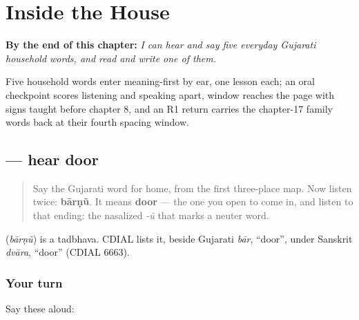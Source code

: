 
\chapter{Inside the House}
\label{ch:gu-inside-the-house}

\begin{chapteropening}
\textbf{By the end of this chapter:} \emph{I can hear and say five everyday Gujarati household words, and read and write one of them.}

Five household words enter meaning-first by ear, one lesson each; an oral checkpoint scores listening and speaking apart, window reaches the page with signs taught before chapter 8, and an R1 return carries the chapter-17 family words back at their fourth spacing window.
\end{chapteropening}

\section[\texorpdfstring{\gu{બારણું} (bārṇũ)}{બારણું (bārṇũ)}]{ — hear door}

\label{lesson:GU-C28-hear-baarnun}



\begin{quote}
Say the Gujarati word for home, from the first three-place map. Now listen twice: \textbf{bārṇũ}. It means \textbf{door} — the one you open to come in, and listen to that ending: the nasalized \emph{-ũ} that marks a neuter word.
\end{quote}

\begin{cousinweb}
\textbf{} (\emph{bārṇũ}) is a tadbhava. CDIAL lists it, beside Gujarati \emph{bār}, \textquotedblleft{}door\textquotedblright{}, under Sanskrit \emph{dvāra}, \textquotedblleft{}door\textquotedblright{} (CDIAL 6663).
\end{cousinweb}

\subsection*{Your turn}
Say these aloud:

